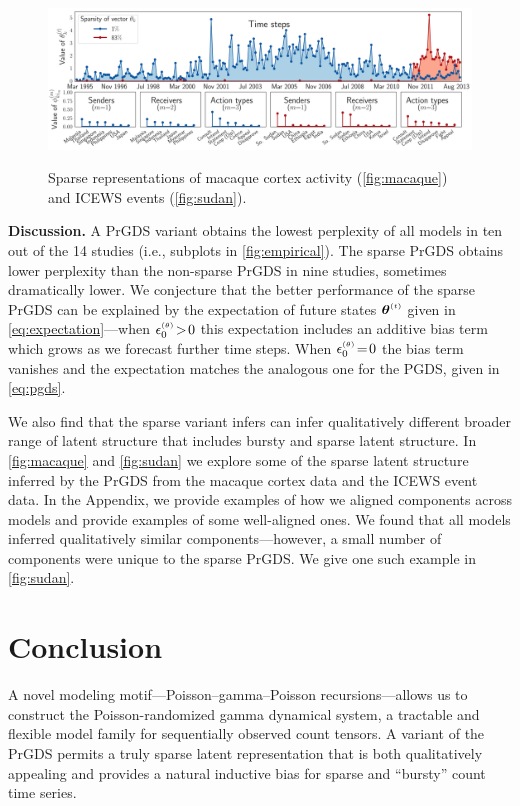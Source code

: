 \documentclass{article}
\begin{document}
\begin{figure}[t]
{
\label{fig:sudan}
\includegraphics[width=\linewidth]{../../fig/components/icews/zero-ordering/double_plots/eps0-components72-0.pdf}
}
% 
\caption{\label{fig:exploratory} Sparse representations of macaque cortex activity (\cref{fig:macaque}) and ICEWS events (\cref{fig:sudan}).}\vspace{-1em}
\end{figure}

\textbf{Discussion.} A PrGDS variant obtains the lowest perplexity of all models in ten out of the 14 studies (i.e., subplots in \cref{fig:empirical}). The sparse PrGDS obtains lower perplexity than the non-sparse PrGDS in nine studies, sometimes dramatically lower. We conjecture that the better performance of the sparse PrGDS can be explained by the expectation of future states $\boldsymbol{\theta}^{\mathsmaller{(t)}}$ given in \cref{eq:expectation}---when $\epstheta \!>\! 0$ this expectation includes an additive bias term which grows as we forecast further time steps. When $\epstheta \teq 0$ the bias term vanishes and the expectation matches the analogous one for the PGDS, given in \cref{eq:pgds}.~ 

We also find that the sparse variant infers can infer qualitatively different broader range of latent structure that includes bursty and sparse latent structure. In \cref{fig:macaque} and \cref{fig:sudan} we explore some of the sparse latent structure inferred by the PrGDS from the macaque cortex data and the ICEWS event data. In the Appendix, we provide examples of how we aligned components across models and provide examples of some well-aligned ones. We found that all models inferred qualitatively similar components---however, a small number of components were unique to the sparse PrGDS. We give one such example in \cref{fig:sudan}.

\vspace{-0.5em}\section{Conclusion}\vspace{-0.5em} A novel modeling motif---Poisson--gamma--Poisson recursions---allows us to construct the Poisson-randomized gamma dynamical system, a tractable and flexible model family for sequentially observed count tensors. A variant of the PrGDS permits a truly sparse latent representation that is both qualitatively appealing and provides a natural inductive bias for sparse and ``bursty'' count time series.
\end{document}
